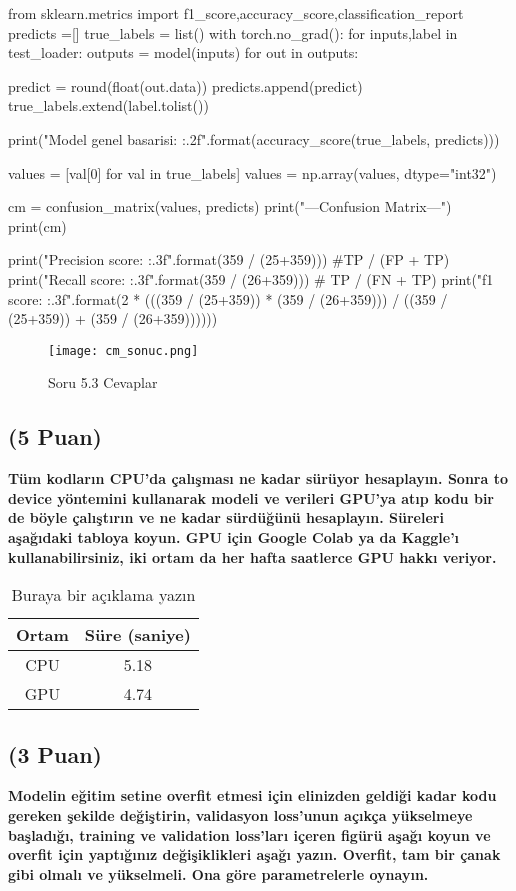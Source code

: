 \documentclass[11pt]{article}
\begin{document}
\begin{python}
from sklearn.metrics import f1_score,accuracy_score,classification_report
predicts =[]
true_labels = list()
with torch.no_grad():
	for inputs,label in test_loader:
		outputs = model(inputs)
		for out in outputs:

			predict = round(float(out.data))
			predicts.append(predict)
		true_labels.extend(label.tolist())

print("Model genel basarisi: {:.2f}".format(accuracy_score(true_labels, predicts)))

values = [val[0] for val in true_labels]
values = np.array(values, dtype="int32")


cm = confusion_matrix(values, predicts)
print("---Confusion Matrix---")
print(cm)

print("Precision score: {:.3f}".format(359 / (25+359))) #TP / (FP + TP)
print("Recall score: {:.3f}".format(359 / (26+359))) # TP / (FN + TP)
print("f1 score: {:.3f}".format(2 * (((359 / (25+359)) * (359 / (26+359))) / ((359 / (25+359)) + (359 / (26+359))))))

\end{python}

\begin{figure}[ht!]
	\centering
	\texttt{[image: cm\_sonuc.png]}
	\caption{Soru 5.3 Cevaplar}
	\label{fig:my_pic2}
\end{figure}

\subsection{(5 Puan)} \textbf{Tüm kodların CPU'da çalışması ne kadar sürüyor hesaplayın. Sonra to device yöntemini kullanarak modeli ve verileri GPU'ya atıp kodu bir de böyle çalıştırın ve ne kadar sürdüğünü hesaplayın. Süreleri aşağıdaki tabloya koyun. GPU için Google Colab ya da Kaggle'ı kullanabilirsiniz, iki ortam da her hafta saatlerce GPU hakkı veriyor.}

\begin{table}[ht!]
    \centering
    \caption{Buraya bir açıklama yazın}
    \begin{tabular}{c|c}
        Ortam & Süre (saniye) \\\hline
        CPU & 5.18 \\
        GPU & 4.74 \\
    \end{tabular}
    \label{tab:my_table}
\end{table}

\subsection{(3 Puan)} \textbf{Modelin eğitim setine overfit etmesi için elinizden geldiği kadar kodu gereken şekilde değiştirin, validasyon loss'unun açıkça yükselmeye başladığı, training ve validation loss'ları içeren figürü aşağı koyun ve overfit için yaptığınız değişiklikleri aşağı yazın. Overfit, tam bir çanak gibi olmalı ve yükselmeli. Ona göre parametrelerle oynayın.}
\end{document}
